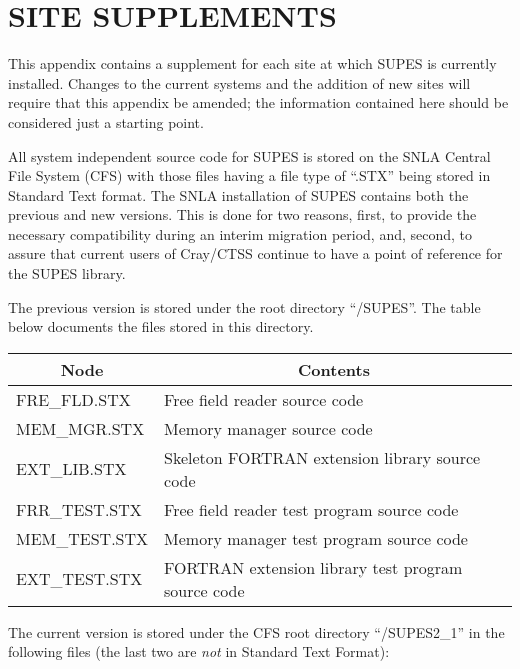 \chapter{SITE SUPPLEMENTS} \label{sec:site}
This appendix contains a supplement for each site at which SUPES is
currently installed.  Changes to the current systems and the addition of new
sites will require that this appendix be amended; the information contained
here should be considered just a starting point.

All system independent source code for SUPES is stored on the SNLA Central
File System (CFS) with those files having a file type of ``.STX''
being stored in Standard Text format.
The SNLA installation of SUPES contains both the previous
and new versions.
This is done for two reasons,
first, to provide the necessary compatibility during an interim
migration period,
and,
second,
to assure that current users of Cray/CTSS continue to have a point of reference
for the SUPES library.

The previous version is stored under the root directory ``/SUPES''.
The table below documents the files stored in this directory. 

\begin{tabular}{|ll|} \hline \hline
\multicolumn{1}{|c}{Node} & \multicolumn{1}{c|}{Contents} \\ \hline
FRE\_FLD.STX   &  Free field reader source code\\
MEM\_MGR.STX   &  Memory manager source code\\
EXT\_LIB.STX   &  Skeleton FORTRAN extension library source code\\
FRR\_TEST.STX  &  Free field reader test program source code\\
MEM\_TEST.STX  &  Memory manager test program source code\\
EXT\_TEST.STX  &  FORTRAN extension library test program source code\\ \hline
\hline
\end{tabular}

The current version is stored under the CFS root directory
``/SUPES2\_1'' in the following files (the last two are {\em not} in Standard Text
Format):

